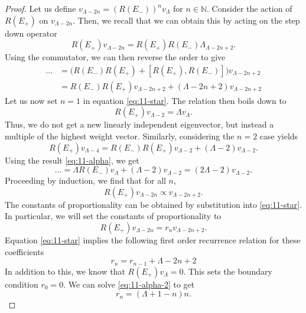 \begin{proof}
  Let us define $v_{\Lambda - 2 n} = (R(E_-))^n v_{\Lambda}$ for $n \in \mathbb{N}$.
  Consider the action of $R(E_+)$ on $v_{\Lambda - 2n}$. Then, we recall that we can obtain this by acting on the step down operator
  \begin{equation}
    R(E_+) v_{\Lambda - 2n} = R(E_+) R(E_-) \Lambda_{\Lambda - 2n + 2}.
  \end{equation}
  Using the commutator, we can then reverse the order to give
  \begin{align}
    \dots &= \bigl(R(E_-) R(E_+) + [R(E_+), R(E_-)]\bigr) v_{\Lambda - 2n + 2} \\
	  &= R(E_-) R(E_+) v_{\Lambda - 2n + 2} + (\Lambda - 2n + 2) v_{\Lambda - 2n + 2}
	  \label{eq:11-star}
  \end{align}
  Let us now set $n = 1$ in equation \eqref{eq:11-star}. The relation then boils down to
  \begin{equation}
    \label{eq:11-alpha}
    R(E_+) v_{\Lambda - 2} = \Lambda v_{\Lambda}.
  \end{equation}
  Thus, we do not get a new linearly independent eigenvector, but instead a multiple of the highest weight vector.
  Similarly, considering the $n = 2$ case yields
  \begin{equation}
    R(E_+) v_{\Lambda - 4} = R(E_-) R(E_+) v_{\Lambda - 2} + (\Lambda - 2) v_{\Lambda - 2}.
  \end{equation}
  Using the result \eqref{eq:11-alpha}, we get
  \begin{equation}
    \dots = \Lambda R(E_-) v_\Lambda + (\Lambda - 2) v_{\Lambda - 2} = (2\Lambda - 2) v_{\Lambda - 2}.
  \end{equation}
  Proceeding by induction, we find that for all $n$,
  \begin{equation}
    R(E_+) v_{\Lambda - 2n} \propto v_{\Lambda - 2n + 2}.
  \end{equation}
  The constants of proportionality can be obtained by substitution into \eqref{eq:11-star}.
  In particular, we will set the constants of proportionality to
  \begin{equation}
    \label{eq:12-star}
    R(E_+) v_{\Lambda - 2n} = r_n v_{\Lambda - 2n + 2}.
  \end{equation}
  Equation \eqref{eq:11-star} implies the following first order recurrence relation for these coefficients 
  \begin{equation}
    \label{eq:11-alpha-2}
    r_n = r_{n-1} + \Lambda - 2n + 2
  \end{equation}
  In addition to this, we know that $R(E_+) v_\Lambda = 0$. This sets the boundary condition $r_0 = 0$.
  We can solve \eqref{eq:11-alpha-2} to get
  \begin{equation}
    r_n = (\Lambda + 1 - n) n.
  \end{equation}


\end{proof}
